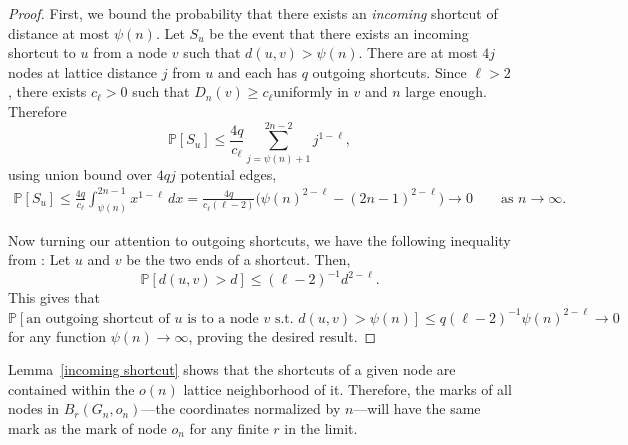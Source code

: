 \documentclass[10pt]{amsart}
\begin{document}
\begin{proof} 
First, we bound the probability that there exists an \textit{incoming} shortcut of distance at most $\psi(n)$. Let $S_u$ be the event that there exists an incoming shortcut to $u$ from a node $v$ such that $d(u, v) > \psi(n)$. There are at most $4j$ nodes at lattice distance $j$ from $u$ and each has $q$ outgoing shortcuts. Since $\ell>2$, there exists $c_\ell>0$ such that $D_n(v)\ge c_\ell $uniformly in $v$ and $n$ large enough. Therefore
\[
\mathbb P[S_u]
\le \frac{4q}{c_\ell}\sum_{j=\psi(n)+1}^{2n-2} j^{1-\ell},
\] using union bound over $4qj$ potential edges,
\begin{align*}
\mathbb P[S_u]
 \le
\frac{4q}{c_\ell}\int_{\psi(n)}^{2n-1} x^{1-\ell}\,dx =
\frac{4q}{c_\ell(\ell-2)}
\bigl(\psi(n)^{2-\ell}-(2n-1)^{2-\ell}\bigr) \to 0
\qquad \text{as } n\to\infty.
\end{align*}

Now turning our attention to outgoing shortcuts, we have the following inequality from \cite[Proof of Theorem 3b]{kleinberg}: Let $u$ and $v$ be the two ends of a shortcut. Then,
\begin{equation} \label{klein}
    \mathbb{P}[d(u, v) > d] \leq (\ell -2)^{-1} d^{2-\ell}.
\end{equation}
This gives that 
\begin{equation*} \label{klein2}\mathbb{P}[\text{an outgoing shortcut of $u$ is to a node $v$ s.t. } d(u, v) > \psi(n)] \leq q (\ell -2)^{-1} \psi(n) ^{2-\ell} \to 0\end{equation*} for any function $\psi(n) \to \infty$, proving the desired result.
\end{proof}
Lemma~\ref{incoming shortcut} shows that the shortcuts of a given node are contained within the $o(n)$ lattice neighborhood of it. Therefore, the marks of all nodes in  $B_r(G_n, o_n)$––the coordinates normalized by $n$––will have the same mark as the mark of node $o_n$ for any finite $r$ in the limit. 
\end{document}
